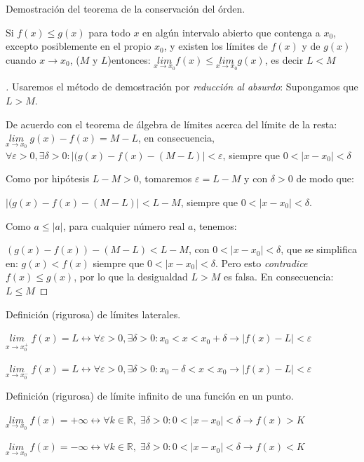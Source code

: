 		\begin{ejem} Demostración del teorema de la conservación del órden.
			
			Si $f(x) \le g(x)$  para todo $x$ en algún intervalo abierto que contenga a $x_0$, excepto posiblemente en el propio $x_0$, y existen los límites de $f(x)$ y de $g(x)$ cuando $x\to x_0$, ($M \mbox{ y }L$)entonces: $\underset {x\to x_0}{lim}{f(x)} \le \underset {x\to x_0}{lim}{g(x)}$, es decir $L<M$
		\end{ejem}
		\begin{proof}[]%
		Usaremos el método de demostración por \emph{reducción al absurdo}: Supongamos que $L>M$.
		
		De acuerdo con el teorema de álgebra de límites acerca del límite de la resta: 	$\underset {x\to x_0}{lim}\;{g(x)-f(x)}=M-L$, en consecuencia, $\forall \varepsilon>0, \exists \delta>0: |(g(x)-f(x)-(M-L)|<\varepsilon$, siempre que $0<|x-x_0|<\delta$
		
		Como por hipótesis $L-M>0$, tomaremos $\varepsilon=L-M$ y con $\delta>0$ de modo que:
		
		$|(g(x)-f(x)-(M-L)|<L-M$, siempre que $0<|x-x_0|<\delta$.
		
		Como $a\le|a|$, para cualquier número real $a$, tenemos:
		
		$(g(x)-f(x))-(M-L)<L-M$, con $0<|x-x_0|<\delta$, que se simplifica en: $g(x)<f(x)$ siempre que $0<|x-x_0|<\delta$. Pero esto \emph{contradice} $f(x)\le g(x)$, por lo que la desigualdad $L>M$ es falsa. En consecuencia: $L\le M$
		\end{proof}
	
	\begin{defi}Definición (rigurosa) de límites laterales.
	
	$\underset{x\to x_0^+}{lim}\;{f(x)}=L \leftrightarrow \forall \varepsilon>0, \exists \delta>0: x_0<x<x_0+\delta \to |f(x)-L|<\varepsilon$
	
	$\underset{x\to x_0^-}{lim}\;{f(x)}=L \leftrightarrow \forall \varepsilon>0, \exists \delta>0: x_0-\delta<x<x_0 \to |f(x)-L|<\varepsilon$
	
		
	\end{defi}

	

	\begin{defi} Definición (rigurosa) de límite infinito de una función en un punto.
	
	 $\underset {x\to x_0}{lim}\; {f(x)}=+\infty \leftrightarrow \forall k \in \mathbb R,\; \exists \delta>0: 0<|x-x_0|<\delta \to f(x)>K $	
	
	 $\underset {x\to x_0}{lim}\; {f(x)}=-\infty \leftrightarrow \forall k \in \mathbb R,\; \exists \delta>0: 0<|x-x_0|<\delta \to f(x)<K $	
	\end{defi}
	
